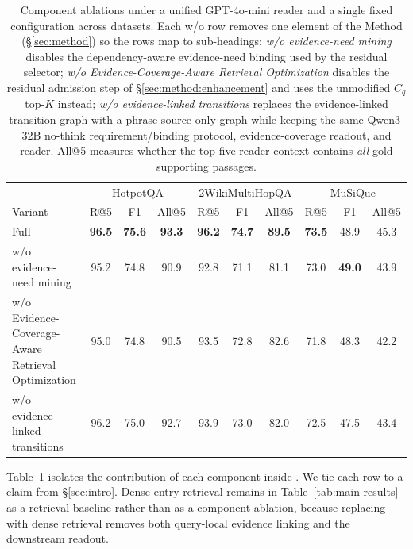 \begin{table}[t]
\centering
\small
\setlength{\tabcolsep}{4pt}
\begin{tabular}{lccc ccc ccc}
\toprule
& \multicolumn{3}{c}{HotpotQA} &
\multicolumn{3}{c}{2WikiMultiHopQA} &
\multicolumn{3}{c}{MuSiQue} \\
\cmidrule(lr){2-4}\cmidrule(lr){5-7}\cmidrule(lr){8-10}
Variant & R@5 & F1 & All@5 & R@5 & F1 & All@5 & R@5 & F1 & All@5 \\
\midrule
Full \methodname{} & \textbf{96.5} & \textbf{75.6} & \textbf{93.3}
& \textbf{96.2} & \textbf{74.7} & \textbf{89.5}
& \textbf{73.5} & 48.9 & 45.3 \\
\midrule
w/o evidence-need mining                      & 95.2 & 74.8 & 90.9 & 92.8 & 71.1 & 81.1 & 73.0 & \textbf{49.0} & 43.9 \\
w/o Evidence-Coverage-Aware Retrieval Optimization
                                                & 95.0 & 74.8 & 90.5 & 93.5 & 72.8 & 82.6 & 71.8 & 48.3 & 42.2 \\
w/o evidence-linked transitions               & 96.2 & 75.0 & 92.7 & 93.9 & 73.0 & 82.0 & 72.5 & 47.5 & 43.4 \\
\bottomrule
\end{tabular}
\caption{Component ablations under a unified GPT-4o-mini reader and
a single fixed configuration across datasets. Each w/o row removes
one element of the Method (\S\ref{sec:method}) so the rows map to
sub-headings: \emph{w/o evidence-need mining} disables the
dependency-aware evidence-need binding used by the residual selector;
\emph{w/o Evidence-Coverage-Aware Retrieval Optimization} disables
the residual admission step of \S\ref{sec:method:enhancement} and uses
the unmodified $C_q$ top-$K$ instead; \emph{w/o evidence-linked
transitions} replaces the evidence-linked transition graph with a
phrase-source-only graph while keeping the same Qwen3-32B no-think
requirement/binding protocol, evidence-coverage readout, and reader.
All@5 measures whether the
top-five reader context contains \emph{all} gold supporting passages.}
\label{tab:ablation}
\end{table}

Table~\ref{tab:ablation} isolates the contribution of each
component inside \methodname{}. We tie each row to a claim from
\S\ref{sec:intro}. Dense entry retrieval remains in
Table~\ref{tab:main-results} as a retrieval baseline rather than as a
component ablation, because replacing \methodname{} with dense retrieval
removes both query-local evidence linking and the downstream readout.

